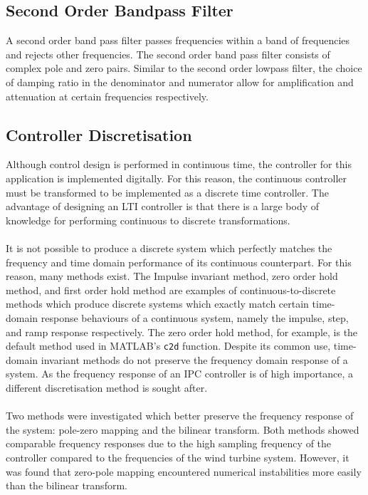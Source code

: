 \subsection{Second Order Bandpass Filter}
A second order band pass filter passes frequencies within a band of frequencies and rejects other frequencies. The second order band pass filter consists of complex pole and zero pairs. Similar to the second order lowpass filter, the choice of damping ratio in the denominator and numerator allow for amplification and attenuation at certain frequencies respectively.
\subsection{Controller Discretisation}
Although control design is performed in continuous time, the controller for this application is implemented digitally. For this reason, the continuous controller must be transformed to be implemented as a discrete time controller. The advantage of designing an LTI controller is that there is a large body of knowledge for performing continuous to discrete transformations. 
\\~\\
It is not possible to produce a discrete system which perfectly matches the frequency and time domain performance of its continuous counterpart. For this reason, many methods exist. The Impulse invariant method, zero order hold method, and first order hold method are examples of continuous-to-discrete methods which produce discrete systems which exactly match certain time-domain response behaviours of a continuous system, namely the impulse, step, and ramp response respectively. The zero order hold method, for example, is the default method used in MATLAB's \texttt{c2d} function. Despite its common use, time-domain invariant methods do not preserve the frequency domain response of a system. As the frequency response of an IPC controller is of high importance, a different discretisation method is sought after.
\\~\\
Two methods were investigated which better preserve the frequency response of the system: pole-zero mapping and the bilinear transform. Both methods showed comparable frequency responses due to the high sampling frequency of the controller compared to the frequencies of the wind turbine system. However, it was found that zero-pole mapping encountered numerical instabilities more easily than the bilinear transform. 
